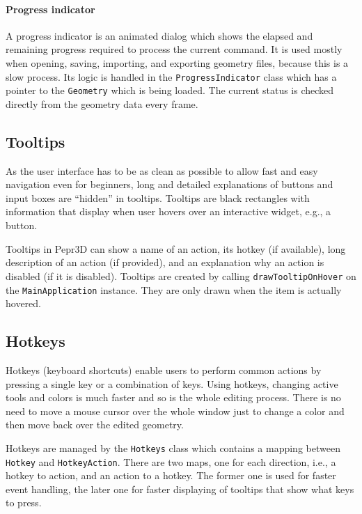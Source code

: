 \paragraph{Progress indicator}
A progress indicator is an animated dialog which shows the elapsed and remaining progress required to process the current command.
It is used mostly when opening, saving, importing, and exporting geometry files, because this is a slow process.
Its logic is handled in the \texttt{ProgressIndicator} class which has a pointer to the \texttt{Geometry} which is being loaded.
The current status is checked directly from the geometry data every frame.

\subsection{Tooltips}

As the user interface has to be as clean as possible to allow fast and easy navigation even for beginners, long and detailed explanations of buttons and input boxes are ``hidden'' in tooltips.
Tooltips are black rectangles with information that display when user hovers over an interactive widget, e.g., a button.

Tooltips in Pepr3D can show a name of an action, its hotkey (if available), long description of an action (if provided), and an explanation why an action is disabled (if it is disabled).
Tooltips are created by calling \texttt{drawTooltipOnHover} on the \texttt{MainApplication} instance.
They are only drawn when the item is actually hovered.

\subsection{Hotkeys}

Hotkeys (keyboard shortcuts) enable users to perform common actions by pressing a single key or a combination of keys.
Using hotkeys, changing active tools and colors is much faster and so is the whole editing process.
There is no need to move a mouse cursor over the whole window just to change a color and then move back over the edited geometry.

Hotkeys are managed by the \texttt{Hotkeys} class which contains a mapping between \texttt{Hotkey} and \texttt{HotkeyAction}.
There are two maps, one for each direction, i.e., a hotkey to action, and an action to a hotkey.
The former one is used for faster event handling, the later one for faster displaying of tooltips that show what keys to press.

